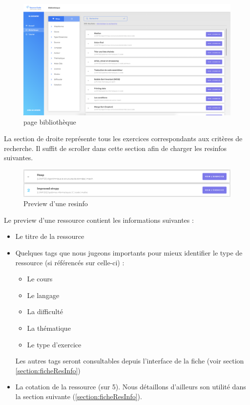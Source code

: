 \begin{figure}[H]
    \includegraphics[width=\textwidth,height=\textheight,keepaspectratio]{images/client/library.png}
    \centering
    \caption[SourceCode : page bibliothèque]{page bibliothèque}
\end{figure}



La section de droite représente tous les exercices correspondants aux critères de recherche. Il suffit de scroller dans cette section afin de charger les \glspl{resinfo} suivantes.\\

\begin{figure}[H]
    \includegraphics[width=\textwidth,height=\textheight,keepaspectratio]{images/client/preview-exercise.png}
    \centering
    \caption[SourceCode : preview d'une \gls{resinfo}]{Preview d'une \gls{resinfo}}
\end{figure}

Le preview d'une ressource contient les informations suivantes :

\begin{itemize}
    \item Le titre de la ressource
    \item Quelques \glspl{tag} que nous jugeons importants pour mieux identifier le type de ressource (si référencés sur celle-ci) : 
    \begin{itemize}
        \item Le cours
        \item Le langage
        \item La difficulté
        \item La thématique
        \item Le type d'exercice
    \end{itemize}
    Les autres \glspl{tag} seront consultables depuis l'interface de la \gls{fiche} (voir section \ref{section:ficheResInfo})
    \item La cotation de la ressource (sur 5). Nous détaillons d'ailleurs son utilité dans la section suivante (\ref{section:ficheResInfo}).
\end{itemize}

